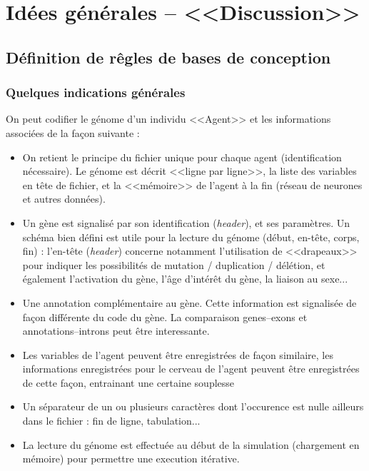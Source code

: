 \documentclass[11pt,twoside,a4paper]{article}
\begin{document}
\clearpage

\section{Id{\'e}es g{\'e}n{\'e}rales -- <<Discussion>>}

\subsection{D{\'e}finition de r{\^e}gles de bases de conception}

\subsubsection{Quelques indications g{\'e}n{\'e}rales}

On peut codifier le g{\'e}nome d'un individu <<Agent>> et les informations associ{\'e}es de la fa\c{c}on suivante :
\begin{itemize}
	\item On retient le principe du fichier unique pour chaque agent (identification n{\'e}cessaire). Le g{\'e}nome est d{\'e}crit <<ligne par ligne>>, la liste des variables en t{\^e}te de fichier, et la <<m{\'e}moire>> de l'agent {\`a} la fin (r{\'e}seau de neurones et autres donn{\'e}es).
	\item Un g{\`e}ne est signalis{\'e} par son identification (\textit{header}), et ses param{\`e}tres. Un sch{\'e}ma bien d{\'e}fini est utile pour la lecture du g{\'e}nome (d{\'e}but, en-t{\^e}te, corps, fin) : l'en-t{\^e}te (\textit{header}) concerne notamment l'utilisation de <<drapeaux>> pour indiquer les possibilit{\'e}s de mutation / duplication / d{\'e}l{\'e}tion, et {\'e}galement l'activation du g{\`e}ne, l'{\^a}ge d'int{\'e}r{\^e}t du g{\`e}ne, la liaison au sexe...
	\item Une annotation compl{\'e}mentaire au g{\`e}ne. Cette information est signalis{\'e}e de fa\c{c}on diff{\'e}rente du code du g{\`e}ne. La comparaison genes--exons et annotations--introns peut {\^e}tre interessante. 
	\item Les variables de l'agent peuvent {\^e}tre enregistr{\'e}es de fa\c{c}on similaire, les informations enregistr{\'e}es pour le cerveau de l'agent peuvent {\^e}tre enregistr{\'e}es de cette fa\c{c}on, entrainant une certaine souplesse
	\item Un s{\'e}parateur de un ou plusieurs caract{\`e}res dont l'occurence est nulle ailleurs dans le fichier : fin de ligne, tabulation...
	\item La lecture du g{\'e}nome est effectu{\'e}e au d{\'e}but de la simulation (chargement en m{\'e}moire) pour permettre une execution it{\'e}rative. 
\end{itemize}~\\
\end{document}
